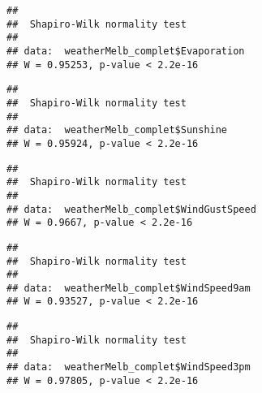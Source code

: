 \documentclass[
]{article}
\newenvironment{Shaded}{\begin{snugshade}}{\end{snugshade}}
\newcommand{\KeywordTok}[1]{\textcolor[rgb]{0.13,0.29,0.53}{\textbf{#1}}}
\newcommand{\NormalTok}[1]{#1}
\newcommand{\OperatorTok}[1]{\textcolor[rgb]{0.81,0.36,0.00}{\textbf{#1}}}
\begin{document}
\begin{verbatim}
## 
##  Shapiro-Wilk normality test
## 
## data:  weatherMelb_complet$Evaporation
## W = 0.95253, p-value < 2.2e-16
\end{verbatim}

\begin{Shaded}
\end{Shaded}

\begin{verbatim}
## 
##  Shapiro-Wilk normality test
## 
## data:  weatherMelb_complet$Sunshine
## W = 0.95924, p-value < 2.2e-16
\end{verbatim}

\begin{Shaded}
\end{Shaded}

\begin{verbatim}
## 
##  Shapiro-Wilk normality test
## 
## data:  weatherMelb_complet$WindGustSpeed
## W = 0.9667, p-value < 2.2e-16
\end{verbatim}

\begin{Shaded}
\end{Shaded}

\begin{verbatim}
## 
##  Shapiro-Wilk normality test
## 
## data:  weatherMelb_complet$WindSpeed9am
## W = 0.93527, p-value < 2.2e-16
\end{verbatim}

\begin{Shaded}
\end{Shaded}

\begin{verbatim}
## 
##  Shapiro-Wilk normality test
## 
## data:  weatherMelb_complet$WindSpeed3pm
## W = 0.97805, p-value < 2.2e-16
\end{verbatim}
\end{document}
